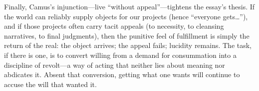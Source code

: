 Finally, Camus's injunction—live ``without appeal''—tightens the essay's thesis. If the world
can reliably supply objects for our projects (hence ``everyone gets\ldots''), and if those
projects often carry tacit appeals (to necessity, to cleansing narratives, to final judgments),
then the punitive feel of fulfillment is simply the return of the real: the object arrives; the
appeal fails; lucidity remains. The task, if there is one, is to convert willing from a demand
for consummation into a discipline of revolt—a way of acting that neither lies about meaning
nor abdicates it. Absent that conversion, getting what one wants will continue to accuse the
will that wanted it.
